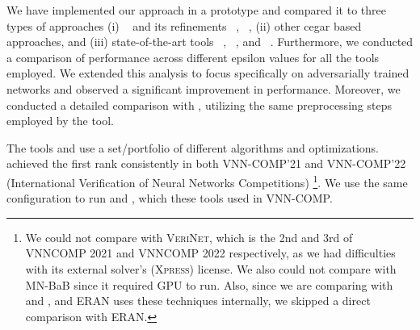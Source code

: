 We have implemented our approach in a prototype and compared it to three types of approaches 
(i) \deeppoly{}~\cite{singh2019abstract} and its refinements \kpoly{}~\cite{singh2019beyond}, \deepsrgr{}~\cite{yang2021improving}, 
(ii) other cegar based approaches, and 
(iii) state-of-the-art tools \alphabeta~\cite{zhang2018efficient,wang2021beta,xu2020fast,zhang2022branch,tjeng2017evaluating}, 
\ovaltool~\cite{bunel2018unified,bunel2020branch,bunel2020lagrangian,de2021scaling,de2021scaling,de2021scaling2,de2021improved}, 
and \marabou~\cite{katz2019marabou}. 
Furthermore, we conducted a comparison of performance across different epsilon values for all the tools employed. 
We extended this analysis to focus specifically on adversarially trained networks and observed a significant improvement 
in performance. Moreover, we conducted a detailed comparison with \alphabeta{}, 
utilizing the same preprocessing steps employed by the \alphabeta{} tool.

The tools \alphabeta{} and \ovaltool{} use a set/portfolio of different algorithms and optimizations. \alphabeta{} achieved the first rank consistently in both 
VNN-COMP'21 and VNN-COMP'22 (International Verification of Neural Networks Competitions) %
\footnote{We could not compare with \textsc{VeriNet}, which is the 2nd and 3rd of VNNCOMP 2021 and VNNCOMP 2022 respectively, as we had difficulties with its external solver's (\textsc{Xpress}) license. We also
could not compare with MN-BaB since it required GPU to run.  
Also, since we are comparing with \deeppoly{} and \kpoly{}, and \textsc{ERAN} uses these techniques internally, we skipped a direct comparison with \textsc{ERAN}.}.%
We use the same configuration to run \alphabeta{} and \ovaltool{}, which these tools used in VNN-COMP.

